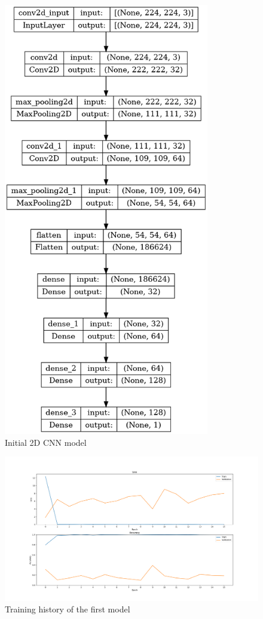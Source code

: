 \begin{figure}[]
    \centering
    \includegraphics[width=0.8\textwidth, height=1.3\textwidth]{images/2D_3_noDrop.png}
    \caption{Initial 2D CNN model}
    \label{fig:First2DCNN}
\end{figure}

\begin{figure}[]
    \centering
    \includegraphics[width=1\textwidth]{images/731a-2D3-86ad-history.png}
    \caption{Training history of the first model}
    \label{fig:First2DCNNHistory}
\end{figure}

